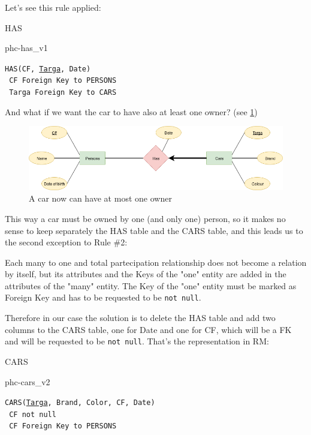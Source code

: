 \documentclass[class=book, crop=false, oneside]{standalone}
\newcommand\tab[1][1cm]{\hspace*{#1}}
\begin{document}
Let's see this rule applied:
\vskip 20pt
\begin{minipage}{.8\textwidth}
	HAS
	\begin{table}[H]
		{phc-has_v1}
	\end{table}
	\texttt{HAS(CF, \underline{Targa}, Date)}\\
	\tab[.4cm] \texttt{	CF Foreign Key to PERSONS}\\
	\tab[.4cm] \texttt{	Targa Foreign Key to CARS}
\end{minipage}
\vskip 20pt
And what if we want the car to have also at least one owner? (see \ref{diagram1_02})
\begin{figure}[H]
	\centering
	\includegraphics[width=\textwidth,keepaspectratio]{diagram1_02.png}
	\caption{A car now can have at most one owner}
	\label{diagram1_02}
\end{figure}
This way a car must be owned by one (and only one) person, so it makes no sense to keep separately the HAS table and the CARS table, and this leads us to the second exception to Rule \#2:

Each many to one and total partecipation relationship does not become a relation by itself, but its attributes and the Keys of the "one" entity are added in the attributes of the "many" entity. The Key of the "one" entity must be marked as Foreign Key and has to be requested to be \texttt{not null}.

Therefore in our case the solution is to delete the HAS table and add two columns to the CARS table, one for Date and one for CF, which will be a FK and will be requested to be \texttt{not null}.
That's the representation in RM:
\vskip 20pt
\begin{minipage}{.8\textwidth}
	CARS
	\begin{table}[H]
		{phc-cars_v2}
	\end{table}
	\texttt{CARS(\underline{Targa}, Brand, Color, CF, Date)}\\
	\tab[.4cm] \texttt{	CF not null}\\
	\tab[.4cm] \texttt{	CF Foreign Key to PERSONS}
\end{minipage}
\vskip 20pt
\end{document}

